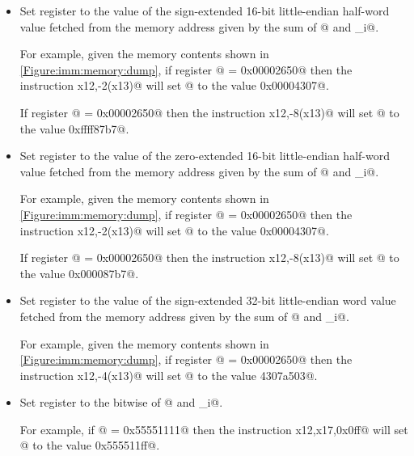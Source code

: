 \begin{itemize}
\item{}
\label{insn:lh}

Set register \verb@rd@ to the value of the sign-extended 16-bit little-endian 
half-word value fetched from the memory address given by the sum 
of @ and \verb@imm_i@.

For example, given the memory contents shown in \autoref{Figure:imm:memory:dump},
if register @ = \verb@0x00002650@ then the instruction
\verb@lh x12,-2(x13)@ will set @ to the value \verb@0x00004307@.

If register @ = \verb@0x00002650@ then the instruction
\verb@lh x12,-8(x13)@ will set @ to the value \verb@0xffff87b7@.

\item{}
\label{insn:lhu}

Set register \verb@rd@ to the value of the zero-extended 16-bit little-endian 
half-word value fetched from the memory address given by the sum 
of @ and \verb@imm_i@.

For example, given the memory contents shown in \autoref{Figure:imm:memory:dump},
if register @ = \verb@0x00002650@ then the instruction
\verb@lhu x12,-2(x13)@ will set @ to the value \verb@0x00004307@.

If register @ = \verb@0x00002650@ then the instruction
\verb@lhu x12,-8(x13)@ will set @ to the value \verb@0x000087b7@.

\item{}
\label{insn:lw}

Set register \verb@rd@ to the value of the sign-extended 32-bit little-endian 
word value fetched from the memory address given by the sum 
of @ and \verb@imm_i@.

For example, given the memory contents shown in \autoref{Figure:imm:memory:dump},
if register @ = \verb@0x00002650@ then the instruction
\verb@lh x12,-4(x13)@ will set @ to the value \verb@4307a503@.


\item{}
\label{insn:ori}

Set register \verb@rd@ to the bitwise \verb@or@ of @ and \verb@imm_i@.

For example, if @ = \verb@0x55551111@ then the instruction 
\verb@ori x12,x17,0x0ff@ will set @ to the value \verb@0x555511ff@.


\end{itemize}
